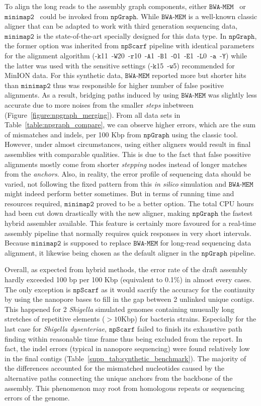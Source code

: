 \documentclass[10pt,twocolumn,twoside]{genpaper}
\newcommand{\npscarf}{$\mathtt{npScarf}$}
\newcommand{\npgraph}{$\mathtt{npGraph}$}
\newcommand{\minimap}{$\mathtt{minimap2}$}
\newcommand{\bwa}{$\mathtt{BWA\text{-}MEM}$}
\begin{document}
To align the long reads to the assembly graph components, either \bwa{}~\cite{Li2013} or \minimap{}~\cite{Li2016} could be invoked from \npgraph{}.
While \bwa{} is a well-known classic aligner that can be adapted to work with third generation sequencing data, \minimap{} is the state-of-the-art specially designed for this data type. 
In \npgraph{}, the former option was inherited from \npscarf{} pipeline with identical parameters for the alignment algorithm
(-$\mathtt{k}$11~-$\mathtt{W}$20~-$\mathtt{r}$10~-$\mathtt{A}$1~-$\mathtt{B}$1~-$\mathtt{O}$1~-$\mathtt{E}$1~-$\mathtt{L}$0~-$\mathtt{a}$~-$\mathtt{Y}$)
while the latter was used with the sensitive settings (-$\mathtt{k}$15~-$\mathtt{w}$5) recommended for MinION data.
For this synthetic data, \bwa{} reported more but shorter hits than \minimap{} thus was responsible for higher number of false positive alignments.
As a result, bridging paths induced by using \bwa{} was slightly less accurate due to more noises from the smaller \emph{steps} inbetween (Figure~\ref{figure:npgraph_merging}).
From all data sets in Table~\ref{table:npgraph_compare}, we can observe higher errors, which are the sum of mismatches and indels, per 100 Kbp from \npgraph{} using the classic tool.
However, under almost circumstances, using either aligners would result in final assemblies with comparable qualities.
This is due to the fact that false possitive alignments mostly come from shorter \emph{stepping} nodes instead of longer matches from the \emph{anchors}.
Also, in reality, the error profile of sequencing data should be varied, not following the fixed pattern from this \emph{in silico} simulation and \bwa{} might indeed perform better sometimes. 
But in terms of running time and resources required, \minimap{} proved to be a better option. 
The total CPU hours had been cut down drastically with the new aligner, making \npgraph{} the fastest hybrid assembler available.
This feature is certainly more favoured for a real-time assembly pipeline that normally requires quick responses in very short intervals.
Because \minimap{} is supposed to replace \bwa{} for long-read sequencing data alignment, it likewise being chosen as the default aligner in the \npgraph{} pipeline.

Overall, as expected from hybrid methods, the error rate of the draft assembly hardly exceeded 100 bp per 100 Kbp (equivalent to 0.1\%) in almost every cases.
The only exception is \npscarf{} as it would sacrify the accuracy for the continuity by using the nanopore bases to fill in the gap between 2 unlinked unique contigs. 
This happened for 2 \emph{Shigella} simulated genomes containing unusually long stretches of repetitive elements ($> 10$Kbp) for bacteria strains. Especially for the last case for \emph{Shigella dysenteriae}, \npscarf{} failed to finish its exhaustive path finding within reasonable time frame thus being excluded from the report.
In fact, the indel errors (typical in nanopore sequencing) were found relatively low in the final contigs (Table~\ref{supp_tab:synthetic_benchmark}).
The majority of the differences accounted for the mismatched nucleotides caused by the alternative paths connecting the unique anchors from the backbone of the assembly.
This phenomenon may root from homologous repeats or sequencing errors of the genome.
\end{document}
